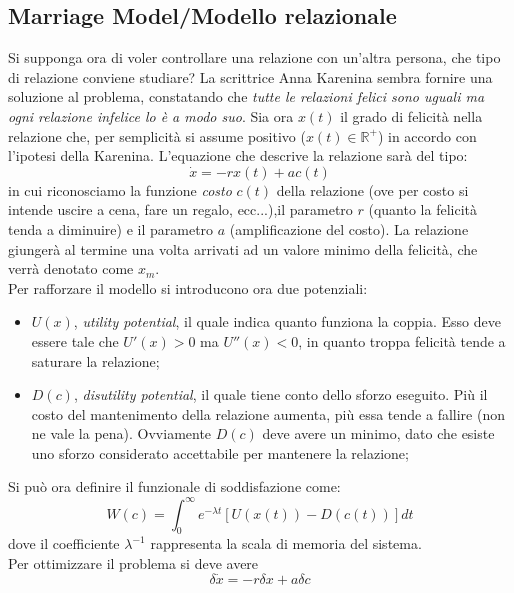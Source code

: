 \documentclass[12pt, a4paper]{book}
\theoremstyle{theorem}
\begin{document}
			\subsection{Marriage Model/Modello relazionale}
				Si supponga ora di voler controllare una relazione con un'altra persona, che tipo di relazione conviene studiare?
				La scrittrice Anna Karenina sembra fornire una soluzione al problema, constatando che \emph{tutte le relazioni felici sono uguali ma ogni relazione infelice lo è a modo suo}.
				Sia ora $x(t)$ il grado di felicità nella relazione che, per semplicità si assume positivo ($x(t)\in\mathbb{R}^{+}$) in accordo con l'ipotesi della Karenina.
				L'equazione che descrive la relazione sarà del tipo:
				\begin{equation}
					\dot{x}=-rx(t)+ac(t)
				\end{equation}
				in cui riconosciamo la funzione \emph{costo} $c(t)$ della relazione (ove per costo si intende uscire a cena, fare un regalo, ecc...),il parametro $r$ (quanto la felicità tenda a diminuire) e il parametro $a$ (amplificazione del costo).
				La relazione giungerà al termine una volta arrivati ad un valore minimo della felicità, che verrà denotato come $x_{m}$.
				\\Per rafforzare il modello si introducono ora due potenziali:
				\begin{itemize}
					\item $U(x)$, \emph{utility potential}, il quale indica quanto funziona la coppia.
						Esso deve essere tale che $U'(x)>0$ ma $U''(x)<0$, in quanto troppa felicità tende a saturare la relazione;
					\item $D(c)$, \emph{disutility potential}, il quale tiene conto dello sforzo eseguito.
						Più il costo del mantenimento della relazione aumenta, più essa tende a fallire (non ne vale la pena).
						Ovviamente $D(c)$ deve avere un minimo, dato che esiste uno sforzo considerato accettabile per mantenere la relazione;
				\end{itemize}
				Si può ora definire il funzionale di soddisfazione come:
				\begin{equation}
					W(c)=\int_{0}^{\infty}e^{-\lambda t}\left[U\left(x(t)\right)-D\left(c(t)\right)\right]dt
				\end{equation}
				dove il coefficiente $\lambda^{-1}$ rappresenta la scala di memoria del sistema.
				\\Per ottimizzare il problema si deve avere
				\begin{equation}
					\delta\dot{x}=-r\delta x+a\delta c
				\end{equation}
\end{document}
